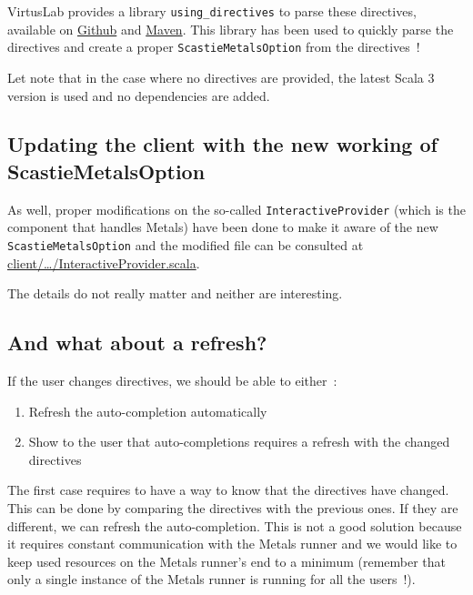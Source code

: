 \documentclass{article}
\begin{document}
VirtusLab provides a library \lstinline{using_directives} to parse these directives, available on \href{https://github.com/VirtusLab/using_directives}{Github} and \href{https://mvnrepository.com/artifact/org.virtuslab.scala-cli/directives_3}{Maven}. This library has been used to quickly parse the directives and create a proper \lstinline{ScastieMetalsOption} from the directives~!

Let note that in the case where no directives are provided, the latest Scala 3 version is used and no dependencies are added.

\subsection{Updating the client with the new working of ScastieMetalsOption}

As well, proper modifications on the so-called \lstinline{InteractiveProvider} (which is the component that handles Metals) have been done to make it aware of the new \lstinline{ScastieMetalsOption} and the modified file can be consulted at \href{https://github.com/Maeeen/scastie/blob/main/client/src/main/scala/com.olegych.scastie.client/components/editor/InteractiveProvider.scala#LL46C26-L46C26}{client/\ldots/InteractiveProvider.scala}.

The details do not really matter and neither are interesting.

\subsection{And what about a refresh?}

If the user changes directives, we should be able to either~:

\begin{enumerate}
    \item Refresh the auto-completion automatically
    \item Show to the user that auto-completions requires a refresh with the changed directives
\end{enumerate}

The first case requires to have a way to know that the directives have changed. This can be done by comparing the directives with the previous ones. If they are different, we can refresh the auto-completion. This is not a good solution because it requires constant communication with the Metals runner and we would like to keep used resources on the Metals runner's end to a minimum (remember that only a single instance of the Metals runner is running for all the users~!).
\end{document}
